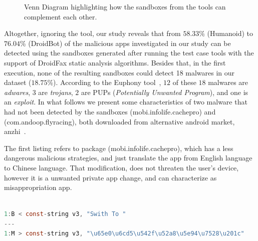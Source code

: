 \begin{figure}[htb]
  \caption{Venn Diagram highlighting how the sandboxes from the tools can
    complement each other.}
  \label{fig:venn-plot1}
\end{figure}


Altogether, ignoring the \joke tool, our study reveals that from $58.33$\% (Humanoid)
to $76.04$\% (DroidBot) of the malicious apps investigated in our study can be
detected using the sandboxes generated after running the test case tools with the support of DroidFax static analysis algorithms. Besides that, in the first execution, none of the resulting sandboxes could detect 18 malwares in our dataset ($18.75$\%). According to the Euphony tool~\cite{hurier2017euphony}, $12$ of these $18$ malwares are \emph{adwares}, $3$ are \emph{trojans}, $2$ are PUPs (\emph{Potentially Unwanted Program}), and one is an \emph{exploit}. In what follows we present some characteristics of two malware that had not been detected by the sandboxes (mobi.infolife.cachepro) and (com.andoop.flyracing), both downloaded from alternative android market, anzhi~\cite{anzhi}.

The first listing refers to package (mobi.infolife.cachepro), which has a less dangerous malicious strategies, and just translate the app from English language to Chinese language. That modification, does not threaten the user's device, however it is a unwanted private app change, and can characterize as misappropriation app.

\begin{lstlisting}[caption= smali/mobi/infolife/cachepro/h.smali - (mobi.infolife.cachepro),language=Java, basicstyle=\fontsize{8}{6}\selectfont\ttfamily,label={lst:mobi.infolife.cachepro}]

1:B < const-string v3, "Swith To "
---
1:M > const-string v3, "\u65e0\u6cd5\u542f\u52a8\u5e94\u7528\u201c"
\end{lstlisting}

